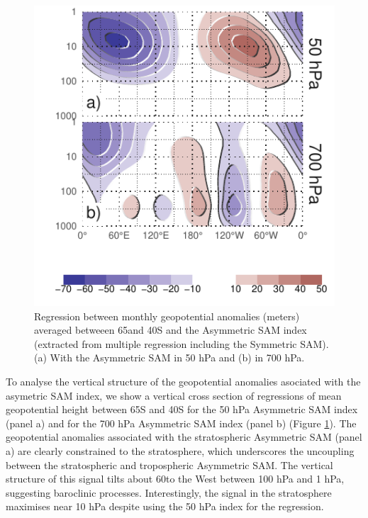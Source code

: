 \documentclass[]{ametsocV5}
\begin{document}
\begin{figure}
\includegraphics{vertical-regression-1} \caption[Regression between monthly geopotential anomalies (meters) averaged betweeen 65\degree and 40\degree S and the Asymmetric SAM index (extracted from multiple regression including the Symmetric SAM)]{Regression between monthly geopotential anomalies (meters) averaged betweeen 65\degree and 40\degree S and the Asymmetric SAM index (extracted from multiple regression including the Symmetric SAM). (a) With the Asymmetric SAM in 50 hPa and (b) in 700 hPa.}\label{fig:vertical-regression}
\end{figure}

To analyse the vertical structure of the geopotential anomalies
asociated with the asymetric SAM index, we show a vertical cross section
of regressions of mean geopotential height between 65\degree S and
40\degree S for the 50 hPa Asymmetric SAM index (panel a) and for the
700 hPa Asymmetric SAM index (panel b) (Figure
\ref{fig:vertical-regression}). The geopotential anomalies associated
with the stratospheric Asymmetric SAM (panel a) are clearly constrained
to the stratosphere, which underscores the uncoupling between the
stratospheric and tropospheric Asymmetric SAM. The vertical structure of
this signal tilts about 60\degree to the West between 100 hPa and 1 hPa,
suggesting baroclinic processes. Interestingly, the signal in the
stratosphere maximises near 10 hPa despite using the 50 hPa index for
the regression.
\end{document}

